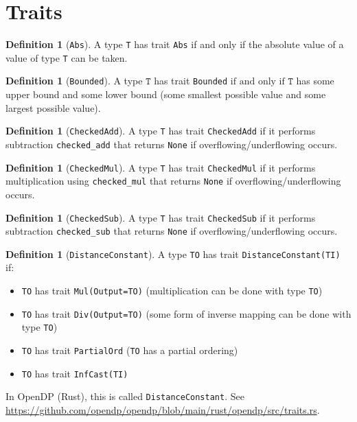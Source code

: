 \documentclass[11pt,a4paper]{article}
\theoremstyle{definition}
\newtheorem{definition}[theorem]{Definition}
\newcommand{\inOpenDPRust}[2]{In OpenDP (Rust), this is called \texttt{#1}. See \url{#2}.}
\newcommand{\T}{\texttt{T}}
\newcommand{\iffText}{\text{if and only if}}
\begin{document}
\section{Traits}

\begin{definition}[\texttt{Abs}]
    A type \texttt{T} has trait \texttt{Abs} if and only if the absolute value of a value of type \texttt{T} can be taken.
\end{definition}

\begin{definition}[\texttt{Bounded}]
    A type $\T$ has trait \texttt{Bounded} $\iffText$ $\T$ has some upper bound and some lower bound (some smallest possible value and some largest possible value).
\end{definition}

\begin{definition}[\texttt{CheckedAdd}]
    A type \texttt{T} has trait \texttt{CheckedAdd} if it performs subtraction \texttt{checked\_add} that returns \texttt{None} if overflowing/underflowing occurs.
\end{definition}

\begin{definition}[\texttt{CheckedMul}]
    A type \texttt{T} has trait \texttt{CheckedMul} if it performs multiplication using \texttt{checked\_mul} that returns \texttt{None} if overflowing/underflowing occurs.
\end{definition}

\begin{definition}[\texttt{CheckedSub}]
    A type \texttt{T} has trait \texttt{CheckedSub} if it performs subtraction \texttt{checked\_sub} that returns \texttt{None} if overflowing/underflowing occurs.
\end{definition}

\begin{definition}[\texttt{DistanceConstant}]
    A type \texttt{TO} has trait \texttt{DistanceConstant(TI)} if:
    \begin{itemize}
        \item \texttt{TO} has trait \texttt{Mul(Output=TO)} (multiplication can be done with type \texttt{TO})
        \item \texttt{TO} has trait \texttt{Div(Output=TO)} (some form of inverse mapping can be done with type \texttt{TO})
        \item \texttt{TO} has trait \texttt{PartialOrd} (\texttt{TO} has a partial ordering)
        \item \texttt{TO} has trait \texttt{InfCast(TI)}
    \end{itemize}
    
    \inOpenDPRust{DistanceConstant}{https://github.com/opendp/opendp/blob/main/rust/opendp/src/traits.rs}
\end{definition}
\end{document}
